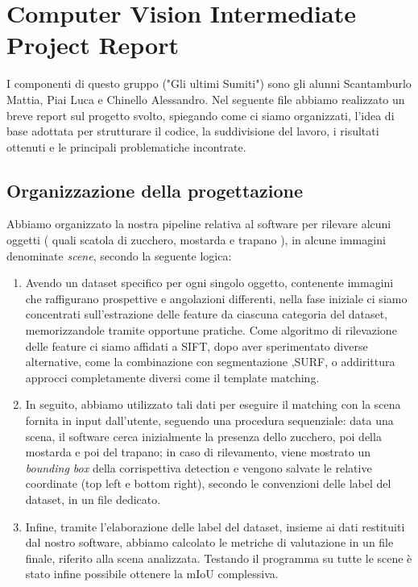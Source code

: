 \documentclass{article}
\begin{document}
\section*{\textbf{Computer Vision Intermediate Project Report}}

I componenti di questo gruppo ("Gli ultimi Sumiti") sono gli alunni Scantamburlo Mattia, Piai Luca e Chinello Alessandro.  
Nel seguente file abbiamo realizzato un breve report sul progetto svolto, spiegando come ci siamo organizzati, l’idea di base adottata per strutturare il codice, la suddivisione del lavoro, i risultati ottenuti e le principali problematiche incontrate.

\subsection*{Organizzazione della progettazione}
Abbiamo organizzato la nostra pipeline relativa al software per rilevare alcuni oggetti ( quali scatola di zucchero, mostarda e trapano ), in alcune immagini denominate \textit{scene}, secondo la seguente logica:  
\begin{enumerate}
    \item Avendo un dataset specifico per ogni singolo oggetto, contenente immagini che raffigurano prospettive e angolazioni differenti, nella fase iniziale ci siamo concentrati sull’estrazione delle feature da ciascuna categoria del dataset, memorizzandole tramite opportune pratiche. Come algoritmo di rilevazione delle feature ci siamo affidati a SIFT, dopo aver sperimentato diverse alternative, come la combinazione con segmentazione ,SURF, o addirittura approcci completamente diversi come il template matching.

    \item In seguito, abbiamo utilizzato tali dati per eseguire il matching con la scena fornita in input dall’utente, seguendo una procedura sequenziale: data una scena, il software cerca inizialmente la presenza dello zucchero, poi della mostarda e poi del trapano; in caso di rilevamento, viene mostrato un \textit{bounding box} della corrispettiva detection e vengono salvate le relative coordinate (top left e bottom right), secondo le convenzioni delle label del dataset, in un file dedicato. 

    \item Infine, tramite l’elaborazione delle label del dataset, insieme ai dati restituiti dal nostro software, abbiamo calcolato le metriche di valutazione in un file finale, riferito alla scena analizzata. Testando il programma su tutte le scene è stato infine possibile ottenere la mIoU complessiva.
\end{enumerate}
\end{document}
